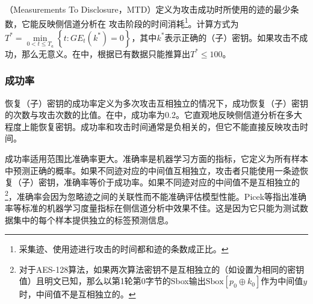 {	\subsubsection{\chenggongtiaoshu }
	\chenggongtiaoshu \citep{Kim14}（Measurements To Disclosure，MTD）定义为攻击成功时所使用的迹的最少条数，它能反映侧信道分析在
	攻击阶段的时间消耗\footnote{采集迹、使用迹进行攻击的时间都和迹的条数成正比。}。\chenggongtiaoshu 计算方式为$T^*=\min\limits_{0<t\le T_a}\left\lbrace t:GE_t(k^*)=0 \right\rbrace $，其中$k^*$表示正确的（子）密钥。如果攻击不成功，那么\chenggongtiaoshu 无意义。在中，根据已有数据只能推算出$T^*\le100$。
	\subsubsection{成功率}
	恢复（子）密钥的成功率定义为多次攻击互相独立的情况下，成功恢复（子）密钥的次数与攻击次数的比值。在中，成功率为0.2。它直观地反映侧信道分析在多大程度上能恢复密钥。成功率和攻击时间通常是负相关的，但它不能直接反映攻击时间。
	
	成功率适用范围比准确率更大。准确率是机器学习方面的指标，它定义为所有样本中预测正确的概率。如果不同迹对应的中间值互相独立，攻击者只能使用一条迹恢复（子）密钥，准确率等价于成功率。如果不同迹对应的中间值不是互相独立的\footnote{对于AES-128算法，如果两次算法密钥不是互相独立的（如设置为相同的密钥值）且明文已知，那么以第1轮第0字节的Sbox输出$\mathrm{Sbox}[p_0\oplus k_0]$作为中间值$y$时，中间值不是互相独立的。}，准确率会因为忽略迹之间的关联性而不能准确评估模型性能。Picek等\citep{Picek19}指出准确率等标准的机器学习度量指标在侧信道分析中效果不佳。这是因为它只能为测试数据集中的每个样本提供独立的标签预测信息。
	{\color{\xchange}
		
%	
%	

}}
